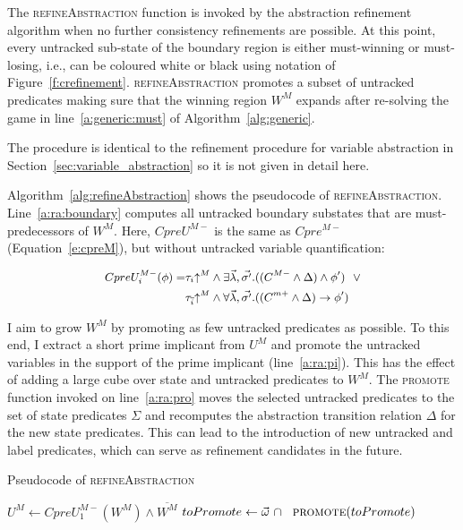 The \textsc{refineAbstraction} function is invoked by the abstraction refinement algorithm when no further consistency refinements are possible.  At this point, every untracked sub-state of the boundary region is either must-winning or must-losing, i.e., can be coloured white or black using notation of Figure~\ref{f:crefinement}.  \textsc{refineAbstraction} promotes a subset of untracked predicates making sure that the winning region $W^M$ expands after re-solving the game in line~\ref{a:generic:must} of Algorithm~\ref{alg:generic}.  

The procedure is identical to the refinement procedure for variable abstraction in Section~\ref{sec:variable_abstraction} so it is not given in detail here.

Algorithm~\ref{alg:refineAbstraction} shows the pseudocode of \textsc{refineAbstraction}.  Line~\ref{a:ra:boundary} computes all untracked boundary substates that are must-predecessors of $W^M$.  Here, $CpreU^{M-}$ is the same as $Cpre^{M-}$ (Equation~\ref{e:cpreM}), but without untracked variable quantification:

$$
    \small
\begin{aligned}
    CpreU_i^{M-}(\phi) = &\tau_i\mathord{\uparrow^M}         \land \exists \vec{\lambda},\vec{\sigma'}. ((C^{M-} \land \Delta) \land \phi')
                          ~~\lor\\
                         &\tau_{\overline{i}}\mathord{\uparrow^M} \land \forall \vec{\lambda},\vec{\sigma'}. ((C^{m+} \land \Delta) \rightarrow \phi')
\end{aligned}
$$

I aim to grow  $W^M$ by promoting as few untracked predicates as possible.  To this end, I extract a short prime implicant from $U^M$ and promote the untracked variables in the support of the prime implicant (line~\ref{a:ra:pi}).  This has the effect of adding a large cube over state and untracked predicates to $W^M$. The \textsc{promote} function invoked on line~\ref{a:ra:pro} moves the selected untracked predicates to the set of state predicates $\Sigma$ and recomputes the abstraction transition relation $\Delta$ for the new state predicates.  This can lead to the introduction of new untracked and label predicates, which can serve as refinement candidates in the future.

\begin{algorithm}[t]

\caption{Pseudocode of \textsc{refineAbstraction}}
\label{alg:refineAbstraction}

\begin{algorithmic}[1]

    \State $U^M \gets CpreU_1^{M-}(W^M) \land \overline{W^M}$ \label{a:ra:boundary}
    \State $toPromote \gets \vec{\omega}~\cap~$\label{a:ra:pi}
    \State $\Call{promote}{toPromote}$\label{a:ra:pro}
\EndFunction

\end{algorithmic}
\end{algorithm}

